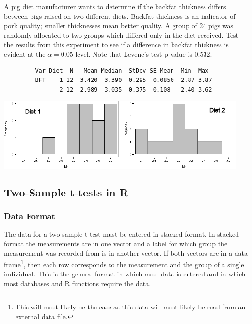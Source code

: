 \documentclass[10pt,openany]{book}\usepackage[]{graphicx}\usepackage[]{color}
\begin{document}
\begin{exsection}
  \item \label{revex:tTestPigBFT} A pig diet manufacturer wants to determine if the backfat thickness differs between pigs raised on two different diets.  Backfat thickness is an indicator of pork quality; smaller thicknesses mean better quality.  A group of 24 pigs was randomly allocated to two groups which differed only in the diet received.  Test the results from this experiment to see if a difference in backfat thickness is evident at the $\alpha=0.05$ level.  Note that Levene's test p-value is 0.532. 
  \begin{Verbatim}
         Var Diet  N   Mean Median  StDev SE Mean  Min  Max
         BFT    1 12  3.420  3.390  0.295  0.0850  2.87 3.87
                2 12  2.989  3.035  0.375  0.108   2.40 3.62
  \end{Verbatim}
  \begin{center}
    \includegraphics[width=5in]{Figs/t2pigbft.png}
  \end{center}

\end{exsection}

\subsection{Two-Sample t-tests in R}
\subsubsection{Data Format}
The data for a two-sample t-test must be entered in stacked format.  In stacked format the measurements are in one vector and a label for which group the measurement was recorded from is in another vector.  If both vectors are in a data frame\footnote{This will most likely be the case as this data will most likely be read from an external data file.}, then each row corresponds to the measurement and the group of a single individual.  This is the general format in which most data is entered and in which most databases and R functions require the data.
\end{document}
